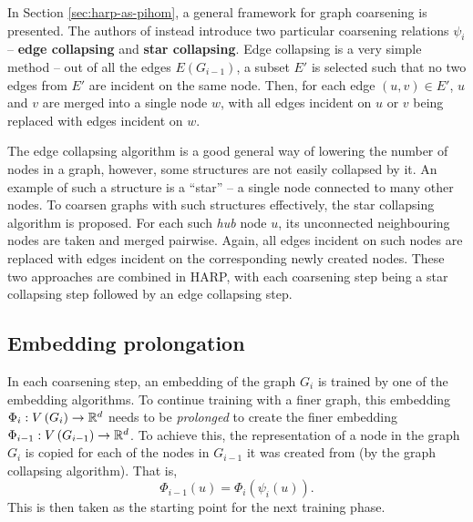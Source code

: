 In Section \ref{sec:harp-as-pihom}, a general framework for graph coarsening is presented. The authors of \cite{chen_harp_2018} instead introduce two particular coarsening relations \( \psi_i \) -- \textbf{edge collapsing} and \textbf{star collapsing}. Edge collapsing is a very simple method -- out of all the edges \( E \left( G_{i - 1} \right) \), a subset \( E' \) is selected such that no two edges from \( E' \) are incident on the same node. Then, for each edge \( \left( u, v \right) \in E' \), \( u \) and \( v \) are merged into a single node \( w \), with all edges incident on \( u \) or \( v \) being replaced with edges incident on \( w \).

The edge collapsing algorithm is a good general way of lowering the number of nodes in a graph, however, some structures are not easily collapsed by it. An example of such a structure is a \enquote{star} -- a single node connected to many other nodes. To coarsen graphs with such structures effectively, the star collapsing algorithm is proposed. For each such \textit{hub} node \( u \), its unconnected neighbouring nodes are taken and merged pairwise. Again, all edges incident on such nodes are replaced with edges incident on the corresponding newly created nodes. These two approaches are combined in HARP, with each coarsening step being a star collapsing step followed by an edge collapsing step.

\subsection{Embedding prolongation}
In each coarsening step, an embedding of the graph \( G_i \) is trained by one of the embedding algorithms. To continue training with a finer graph, this embedding \( \Phi_i: V \left( G_i \right) \to \mathbb{R}^d \) needs to be \textit{prolonged} to create the finer embedding \( \Phi_{i - 1}: V \left( G_{i - 1} \right) \to \mathbb{R}^d \). To achieve this, the representation of a node in the graph \( G_i \) is copied for each of the nodes in \( G_{i - 1} \) it was created from (by the graph collapsing algorithm). That is,
\[ \Phi_{i - 1} \left( u \right) = \Phi_i \left( \psi_i \left( u \right) \right)\text{.} \]
This is then taken as the starting point for the next training phase.
